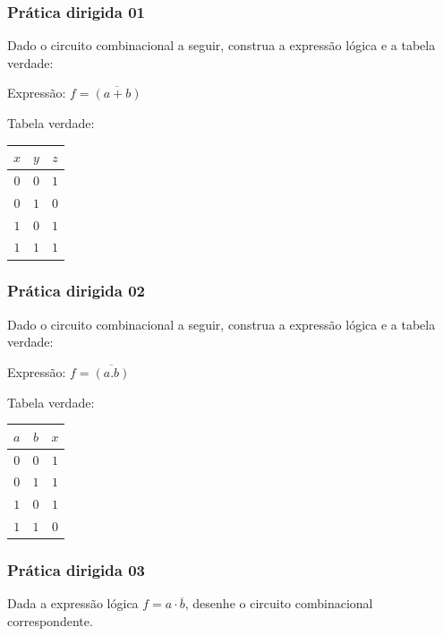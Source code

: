 \begin{frame}
	\frametitle{Prática dirigida 01}
	\par Dado o circuito combinacional a seguir, construa a expressão lógica e a tabela verdade:
	\begin{figure}
		\centering
		
		\label{fig:exe06}
	\end{figure}
	\pause
	\par Expressão: $f=\overline{(a+b)}$
	\par Tabela verdade: \\
	\begin{tabular}{cc|c}
		$x$&$y$&$z$\\
		\hline
		$0$&$0$&$1$\\
		$0$&$1$&$0$\\
		$1$&$0$&$1$\\
		$1$&$1$&$1$\\
	\end{tabular}
\end{frame}

\begin{frame}
	\frametitle{Prática dirigida 02}
	\par Dado o circuito combinacional a seguir, construa a expressão lógica e a tabela verdade:
	\begin{figure}
		\centering
		
		\label{fig:exe07}
	\end{figure}
	\pause
	\par Expressão: $f=\overline{(a.b)}$
	\par Tabela verdade: \\
	\begin{tabular}{cc|c}
		$a$&$b$&$x$\\
		\hline
		$0$&$0$&$1$\\
		$0$&$1$&$1$\\
		$1$&$0$&$1$\\
		$1$&$1$&$0$\\
	\end{tabular}
\end{frame}

\begin{frame}
	\frametitle{Prática dirigida 03}
	\par Dada a expressão lógica \( f = a \cdot \overline{b} \), desenhe o circuito combinacional correspondente. %
	\pause
	\begin{figure}
		\centering
		
		\label{fig:exe10}
	\end{figure}
\end{frame}

